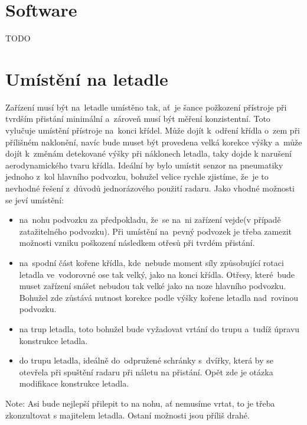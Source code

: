 	\section{Software}\label{navrhReseni::software}
		
		TODO %
	
	\section{Umístění na letadle}\label{navrhReseni::umisteniNaLetadle}
		Zařízení musí být na~letadle umístěno tak, ať~je šance požkození přístroje při tvrdším přistání minimální a~zároveň musí být měření konzistentní. Toto vylučuje umístění přístroje na~konci křídel. Může dojít k~odření křídla o~zem při přílišném naklonění, navíc bude muset být provedena velká korekce výšky a~může dojít k~změnám detekované výšky při náklonech letadla, taky dojde k narušení aerodynamického tvaru křídla. Ideální by bylo umístit senzor na pneumatiky jednoho z~kol hlavního podvozku, bohužel velice rychle zjistíme, že~je to nevhodné řešení z~důvodů jednorázového použití radaru. Jako vhodné možnosti se jeví umístění:
		\begin{itemize}
			\item na~nohu podvozku za předpokladu, že~se na~ni zařízení vejde(v případě zatažitelného podvozku). Při umístění na~pevný podvozek je třeba zamezit možnosti vzniku poškození následkem otřesů při tvrdém přistání. 
			\item na~spodní část kořene křídla, kde~nebude moment síly způsobující rotaci letadla ve~vodorovné ose tak velký, jako na konci křídla. Otřesy, které~bude muset zařízení snášet nebudou tak velké jako na noze hlavního podvozku. Bohužel zde zůstává nutnost korekce podle výšky kořene letadla nad~rovinou podvozku.
			\item na trup letadla, toto bohužel bude vyžadovat vrtání do trupu a~tudíž úpravu konstrukce letadla.
			\item do trupu letadla, ideálně do~odpružené schránky s~dvířky, která by se otevřela při spuštění radaru při náletu na přistání. Opět zde je otázka modifikace konstrukce letadla.
		\end{itemize} 
		Note: Asi bude nejlepší přilepit to na nohu, ať nemusíme vrtat, to je třeba zkonzultovat s majitelem letadla. Ostaní možnosti jsou příliš drahé.


